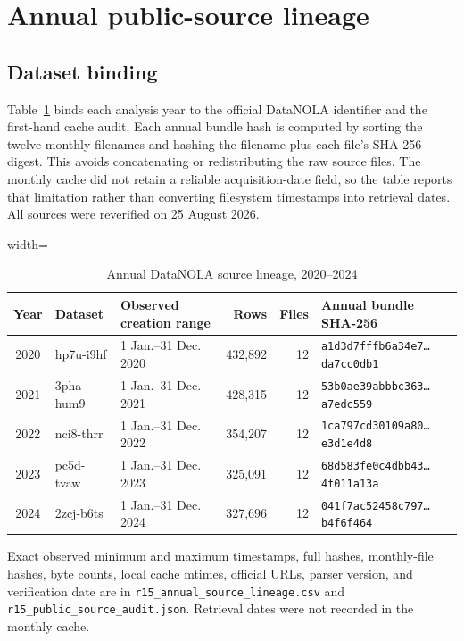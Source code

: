 \documentclass[11pt]{article}
\begin{document}
\section{Annual public-source lineage}

\subsection{Dataset binding}

Table~\ref{tab:lineage} binds each analysis year to the official DataNOLA identifier and the first-hand cache audit. Each annual bundle hash is computed by sorting the twelve monthly filenames and hashing the filename plus each file's SHA-256 digest. This avoids concatenating or redistributing the raw source files. The monthly cache did not retain a reliable acquisition-date field, so the table reports that limitation rather than converting filesystem timestamps into retrieval dates. All sources were reverified on 25 August 2026.

\begin{table}[!htbp]
\centering
\caption{Annual DataNOLA source lineage, 2020--2024}
\label{tab:lineage}
\begin{adjustbox}{width=\textwidth}
\begin{tabular}{@{}cllrrl@{}}
\toprule
Year & Dataset & Observed creation range & Rows & Files & Annual bundle SHA-256 \\
\midrule
2020 & hp7u-i9hf & 1 Jan.--31 Dec. 2020 & 432,892 & 12 & \texttt{a1d3d7fffb6a34e7\ldots da7cc0db1} \\
2021 & 3pha-hum9 & 1 Jan.--31 Dec. 2021 & 428,315 & 12 & \texttt{53b0ae39abbbc363\ldots a7edc559} \\
2022 & nci8-thrr & 1 Jan.--31 Dec. 2022 & 354,207 & 12 & \texttt{1ca797cd30109a80\ldots e3d1e4d8} \\
2023 & pc5d-tvaw & 1 Jan.--31 Dec. 2023 & 325,091 & 12 & \texttt{68d583fe0c4dbb43\ldots 4f011a13a} \\
2024 & 2zcj-b6ts & 1 Jan.--31 Dec. 2024 & 327,696 & 12 & \texttt{041f7ac52458c797\ldots b4f6f464} \\
\bottomrule
\end{tabular}
\end{adjustbox}
\begin{minipage}{0.98\textwidth}\footnotesize
Exact observed minimum and maximum timestamps, full hashes, monthly-file hashes, byte counts, local cache mtimes, official URLs, parser version, and verification date are in \texttt{r15\_annual\_source\_lineage.csv} and \texttt{r15\_public\_source\_audit.json}. Retrieval dates were not recorded in the monthly cache.
\end{minipage}
\end{table}
\end{document}
